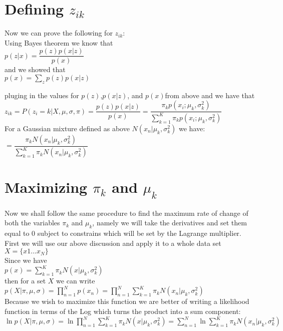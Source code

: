 \documentclass[12pt]{article}
\begin{document}
\section{Defining $z_{ik}$}
\begin{center}
Now we can prove the following for $z_{ik}:$\\
Using Bayes theorem we know that\\
$p(z|x)=\dfrac{p(z)p(x|z)}{p(x)}$ \\
and we showed that \\
$p(x) = \sum_z p(z)p(x|z)$

pluging in the values for $p(z)$,$p(x|z)$, and $p(x)$from above and we have that\\
$z_{ik} = {P(z_i = k | X, \mu ,\sigma, \pi)} = \dfrac{p(z)p(x|z)}{p(x)}= \dfrac {\pi_k p(x_i; \mu_k, \sigma_k^2)}{\sum_{k=1}^{K} \pi_k p(x_i; \mu_k, \sigma_k^2)}$ \\
For a Gaussian mixture defined as above $N(x_n| \mu_k, \sigma_k^2)$ we have:\\
$=\dfrac{\pi_k  N(x_n| \mu_k, \sigma_k^2)}{\sum_{k=1}^K \pi_k  N(x_n| \mu_k, \sigma_k^2)} $

\end{center}

\section{Maximizing $\pi_k$ and $\mu_k$}

\begin{center}
    Now we shall follow the same procedure to find the maximum rate of change of both the variables $\pi_k$ and $\mu_k$, namely we will take the derivatives and set them equal to 0 subject to constrains which will be set by the Lagrange multiplier. \\

    First we will use our above discussion and apply it to a whole data set $X=\{x1...x_N\}$\\
    Since we have \\
    $p(x) = \sum_{k=1}^K \pi_k  N(x| \mu_k, \sigma_k^2)$ \\
    then for a set $X$ we can write\\
    $p(X|\pi,\mu,\sigma)=\prod_{n=1}^N p(x_n) = \prod_{n=1}^N  \sum_{k=1}^K \pi_k  N(x_n| \mu_k, \sigma_k^2) $ \\
    Because we wish to maximize this function we are better of writing a likelihood function in terms of the Log which turns the product into a sum component:\\
    $\ln p(X|\pi,\mu,\sigma) = \ln \prod_{n=1}^N  \sum_{k=1}^K \pi_k  N(x| \mu_k, \sigma_k^2) = \sum_{n=1}^N \ln   \sum_{k=1}^K \pi_k  N(x_n| \mu_k, \sigma_k^2) $
\end{center}
\end{document}
